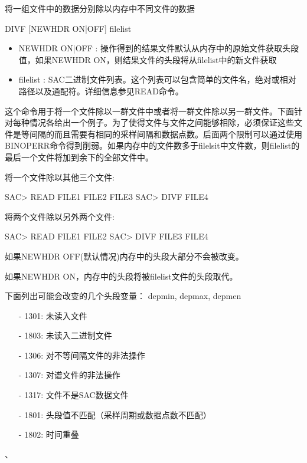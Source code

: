 \label{cmd:divf}

将一组文件中的数据分别除以内存中不同文件的数据

\begin{SACSTX}
DIVF [NEWHDR ON|OFF] filelist
\end{SACSTX}

\begin{itemize}
\item NEWHDR ON|OFF : 操作得到的结果文件默认从内存中的原始文件获取头段值，如果NEWHDR ON，则结果文件的头段将从filelist中的新文件获取 
\item filelist : SAC二进制文件列表。这个列表可以包含简单的文件名，绝对或相对路径以及通配符。详细信息参见READ命令。
\end{itemize}

这个命令用于将一个文件除以一群文件中或者将一群文件除以另一群文件。下面针对每种情况各给出一个例子。为了使得文件与文件之间能够相除，必须保证这些文件是等间隔的而且需要有相同的采样间隔和数据点数。后面两个限制可以通过使用BINOPERR命令得到削弱。如果内存中的文件数多于filelsit中文件数，则filelist的最后一个文件将加到余下的全部文件中。

将一个文件除以其他三个文件:
\begin{SACCode}
SAC> READ FILE1 FILE2 FILE3
SAC> DIVF FILE4
\end{SACCode}

将两个文件除以另外两个文件:
\begin{SACCode}
SAC> READ FILE1 FILE2
SAC> DIVF FILE3 FILE4
\end{SACCode}

如果NEWHDR OFF(默认情况)内存中的头段大部分不会被改变。

如果NEWHDR ON，内存中的头段将被filelist文件的头段取代。

下面列出可能会改变的几个头段变量：
depmin, depmax, depmen

\begin{itemize}
\item[-]1301: 未读入文件
\item[-]1803: 未读入二进制文件
\item[-]1306: 对不等间隔文件的非法操作
\item[-]1307: 对谱文件的非法操作
\item[-]1317: 文件不是SAC数据文件
\item[-]1801: 头段值不匹配（采样周期或数据点数不匹配）
\end{itemize}

\begin{itemize}
\item[-]1802: 时间重叠
\end{itemize}

、
